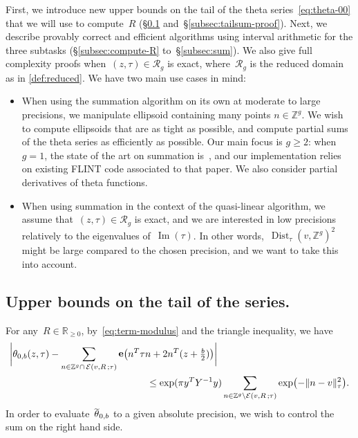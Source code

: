 \documentclass[12pt,oneside]{amsart}
\numberwithin{equation}{section}
\theoremstyle{definition}
\newcommand{\Z}{\mathbb{Z}}
\newcommand{\R}{\mathbb{R}}
\newcommand{\red}{\mathcal{R}}
\newcommand{\eld}[3]{\ensuremath{\mathcal{E}(#1, #2\,; #3)}}
\DeclareMathOperator{\im}{Im}
\DeclareMathOperator{\Dist}{Dist}
\DeclareMathOperator{\thetatilde}{\rlap{\raisebox{-0.1ex}{$\widetilde{\phantom{\,t}}$}}\theta}
\DeclareMathOperator{\e}{\mathbf{e}}
\DeclarePairedDelimiter{\abs}{|}{|}
\DeclarePairedDelimiter{\paren}{(}{)}
\DeclarePairedDelimiter{\norm}{\|}{\|}
\begin{document}
First, we introduce new upper bounds on the tail of the theta
series~\eqref{eq:theta-00} that we will use to compute~$R$
(§\ref{subsec:bound-tail} and~§\ref{subsec:tailsum-proof}). Next, we describe
provably correct and efficient algorithms using interval arithmetic for the
three subtasks (§\ref{subsec:compute-R} to~§\ref{subsec:sum}). We also give
full complexity proofs when~$(z,\tau)\in \red_g$ is exact, where~$\red_g$ is
the reduced domain as in \cref{def:reduced}. We have two main use cases in
mind:
\begin{itemize}
\item When using the summation algorithm on its own at moderate to large
  precisions, we manipulate ellipsoid containing many points $n\in \Z^g$. We
  wish to compute ellipsoids that are as tight as possible, and compute partial
  sums of the theta series as efficiently as possible. Our main focus is
  $g\geq 2$: when $g=1$, the state of the art on summation
  is~\cite{engeShortAdditionSequences2018}, and our implementation relies on
  existing FLINT code associated to that paper. We also consider partial
  derivatives of theta functions.
\item When using summation in the context of the quasi-linear algorithm, we
  assume that~$(z,\tau)\in \red_g$ is exact, and we are interested in low
  precisions relatively to the eigenvalues of~$\im(\tau)$. In other
  words,~$\Dist_\tau(v,\Z^g)^2$ might be large compared to the chosen
  precision, and we want to take this into account.
\end{itemize}

\subsection{Upper bounds on the tail of the series.}
\label{subsec:bound-tail}

For any~$R\in \R_{\geq 0}$, by~\eqref{eq:term-modulus} and the triangle
inequality, we have
\begin{equation}
  \label{eq:triangular}
  \begin{aligned}
    &\abs[\bigg]{\theta_{0,b}(z,\tau) - \sum_{n\in \Z^g\cap \,\eld{v}{R}{\tau}} \e\paren[\big]{n^T\tau n + 2n^T (z + \tfrac b2)}} \\
    &\hspace{5cm}\leq \exp(\pi y^T Y^{-1} y) \sum_{n\in \Z^g \setminus \eld{v}{R}{\tau}} \exp\paren[\big]{-\norm{n - v}_\tau^2}.
  \end{aligned}
\end{equation}
In order to evaluate~$\thetatilde_{0,b}$ to a given absolute precision, we wish
to control the sum on the right hand side.
\end{document}
